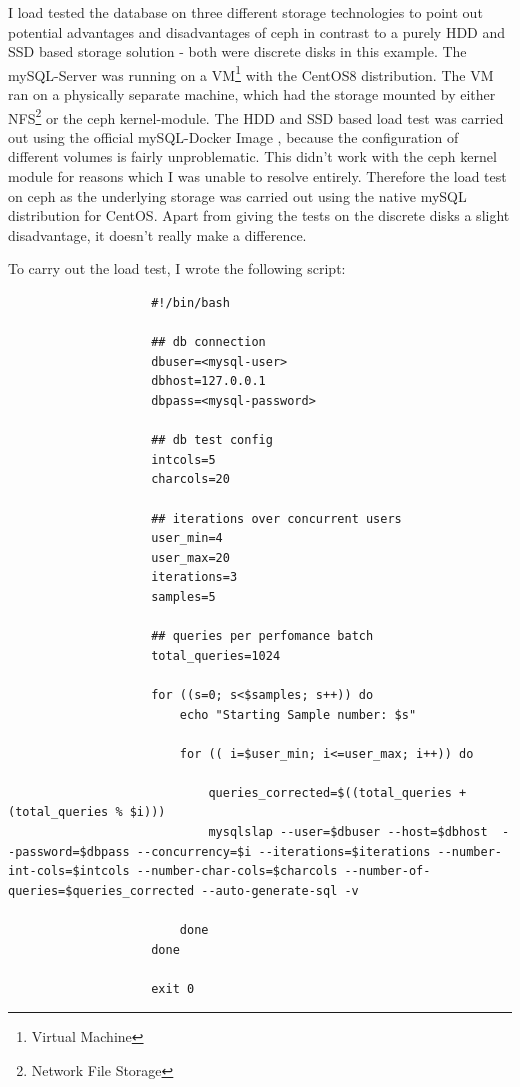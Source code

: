\documentclass[titlepage, a4paper, 11pt]{scrartcl}
\begin{document}
                I load tested the database on three different storage technologies to point out potential advantages and disadvantages of ceph in contrast to a purely HDD and SSD based storage solution - both were discrete disks in this example. The mySQL-Server was running on a VM\footnote{Virtual Machine} with the CentOS8 distribution.
                The VM ran on a physically separate machine, which had the storage mounted by either NFS\footnote{Network File Storage} or the ceph kernel-module. The HDD and SSD based load test was carried out using the official mySQL-Docker Image \cite{mysqlDockerHub}, because the configuration of different volumes is fairly unproblematic. This didn't work with the ceph kernel module for reasons which I was unable to resolve entirely. Therefore the load test on ceph as the underlying storage was carried out using the native mySQL distribution for CentOS. Apart from giving the tests on the discrete disks a slight disadvantage, it doesn't really make a difference.

                To carry out the load test, I wrote the following script:

                \begin{lstlisting}
                    #!/bin/bash

                    ## db connection
                    dbuser=<mysql-user>
                    dbhost=127.0.0.1
                    dbpass=<mysql-password>

                    ## db test config
                    intcols=5
                    charcols=20

                    ## iterations over concurrent users
                    user_min=4
                    user_max=20
                    iterations=3
                    samples=5

                    ## queries per perfomance batch
                    total_queries=1024

                    for ((s=0; s<$samples; s++)) do
                        echo "Starting Sample number: $s"

                        for (( i=$user_min; i<=user_max; i++)) do
                            
                            queries_corrected=$((total_queries + (total_queries % $i)))
                            mysqlslap --user=$dbuser --host=$dbhost  --password=$dbpass --concurrency=$i --iterations=$iterations --number-int-cols=$intcols --number-char-cols=$charcols --number-of-queries=$queries_corrected --auto-generate-sql -v

                        done
                    done

                    exit 0
                \end{lstlisting}
\end{document}
